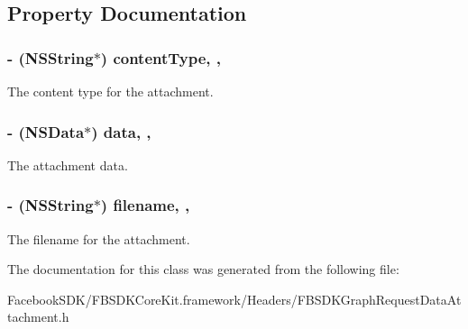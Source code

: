 \subsection{Property Documentation}
\hypertarget{interface_f_b_s_d_k_graph_request_data_attachment_a721d770bcb1b89e4e23d084320636651}{
\subsubsection[{content\-Type}]{\setlength{\rightskip}{0pt plus 5cm}-\/ (N\-S\-String$\ast$) content\-Type\hspace{0.3cm}{\ttfamily [read]}, {\ttfamily [nonatomic]}, {\ttfamily [copy]}}}\label{interface_f_b_s_d_k_graph_request_data_attachment_a721d770bcb1b89e4e23d084320636651}
The content type for the attachment. \hypertarget{interface_f_b_s_d_k_graph_request_data_attachment_add74d6b28d7630f13c711afbfed387c6}{
\subsubsection[{data}]{\setlength{\rightskip}{0pt plus 5cm}-\/ (N\-S\-Data$\ast$) data\hspace{0.3cm}{\ttfamily [read]}, {\ttfamily [nonatomic]}, {\ttfamily [strong]}}}\label{interface_f_b_s_d_k_graph_request_data_attachment_add74d6b28d7630f13c711afbfed387c6}
The attachment data. \hypertarget{interface_f_b_s_d_k_graph_request_data_attachment_a65650c18882e736fc9ddc322008a4a88}{
\subsubsection[{filename}]{\setlength{\rightskip}{0pt plus 5cm}-\/ (N\-S\-String$\ast$) filename\hspace{0.3cm}{\ttfamily [read]}, {\ttfamily [nonatomic]}, {\ttfamily [copy]}}}\label{interface_f_b_s_d_k_graph_request_data_attachment_a65650c18882e736fc9ddc322008a4a88}
The filename for the attachment. 

The documentation for this class was generated from the following file\-:\begin{DoxyCompactItemize}
\item 
Facebook\-S\-D\-K/\-F\-B\-S\-D\-K\-Core\-Kit.\-framework/\-Headers/F\-B\-S\-D\-K\-Graph\-Request\-Data\-Attachment.\-h\end{DoxyCompactItemize}
